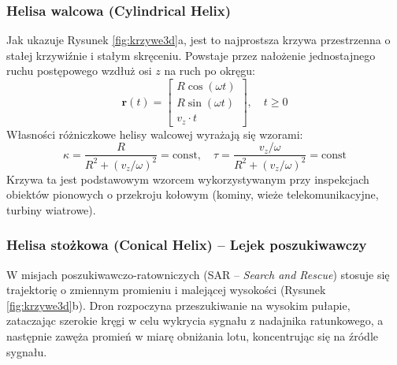 \subsubsection{Helisa walcowa (Cylindrical Helix)}
Jak ukazuje Rysunek \ref{fig:krzywe3d}a, jest to najprostsza krzywa przestrzenna o stałej krzywiźnie i stałym skręceniu. Powstaje przez nałożenie jednostajnego ruchu postępowego wzdłuż osi $z$ na ruch po okręgu:
\begin{equation}
    \mathbf{r}(t) = \begin{bmatrix} R \cos(\omega t) \\ R \sin(\omega t) \\ v_z \cdot t \end{bmatrix}, \quad t \ge 0
\end{equation}
Własności różniczkowe helisy walcowej wyrażają się wzorami:
\begin{equation}
    \kappa = \frac{R}{R^2 + (v_z/\omega)^2} = \text{const}, \quad \tau = \frac{v_z/\omega}{R^2 + (v_z/\omega)^2} = \text{const}
\end{equation}
Krzywa ta jest podstawowym wzorcem wykorzystywanym przy inspekcjach obiektów pionowych o przekroju kołowym (kominy, wieże telekomunikacyjne, turbiny wiatrowe).

\subsubsection{Helisa stożkowa (Conical Helix) -- Lejek poszukiwawczy}
W misjach poszukiwawczo-ratowniczych (SAR -- \textit{Search and Rescue}) stosuje się trajektorię o zmiennym promieniu i malejącej wysokości (Rysunek \ref{fig:krzywe3d}b). Dron rozpoczyna przeszukiwanie na wysokim pułapie, zataczając szerokie kręgi w celu wykrycia sygnału z nadajnika ratunkowego, a następnie zawęża promień w miarę obniżania lotu, koncentrując się na źródle sygnału.

